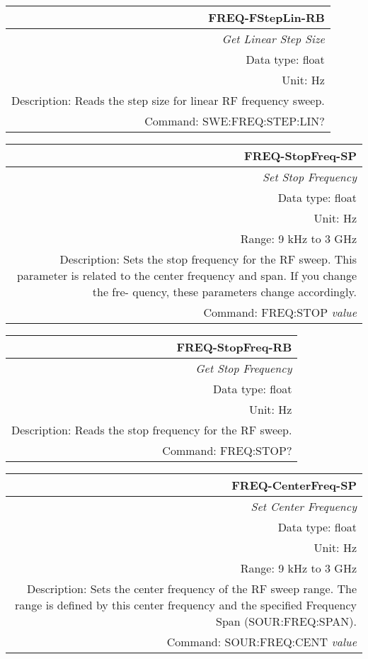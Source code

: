 \documentclass[openany]{article}
\begin{document}
		\begin{tabular}{N}
			\hline
			\bfseries FREQ-FStepLin-RB \\ \hline
			\emph{Get Linear Step Size} \\
			Data type: float \\
			Unit: Hz \\
			Description: Reads the step size for linear RF frequency sweep. \\
			Command: SWE:FREQ:STEP:LIN? \\

		\end{tabular}
%
		\begin{tabular}{N}
			\hline
			\bfseries FREQ-StopFreq-SP \\ \hline
			\emph{Set Stop Frequency} \\
			Data type: float \\
			Unit: Hz \\
			Range: 9 kHz to 3 GHz \\
			Description: Sets the stop frequency for the RF sweep.
This parameter is related to the center frequency and span. If you change the fre-
quency, these parameters change accordingly. \\
			Command: FREQ:STOP \emph{value} \\
			
		\end{tabular}


		\begin{tabular}{N}
			\hline
			\bfseries FREQ-StopFreq-RB \\ \hline
			\emph{Get Stop Frequency} \\
			Data type: float \\
			Unit: Hz \\
			Description: Reads the stop frequency for the RF sweep. \\
			Command: FREQ:STOP? \\

		\end{tabular}
%
		\begin{tabular}{N}
			\hline
			\bfseries FREQ-CenterFreq-SP \\ \hline
			\emph{Set Center Frequency} \\
			Data type: float \\
			Unit: Hz \\
			Range: 9 kHz to 3 GHz \\
			Description: Sets the center frequency of the RF sweep range. The range is defined by this center frequency and the specified Frequency Span (SOUR:FREQ:SPAN). \\
			Command: SOUR:FREQ:CENT \emph{value} \\
			
		\end{tabular}
\end{document}
